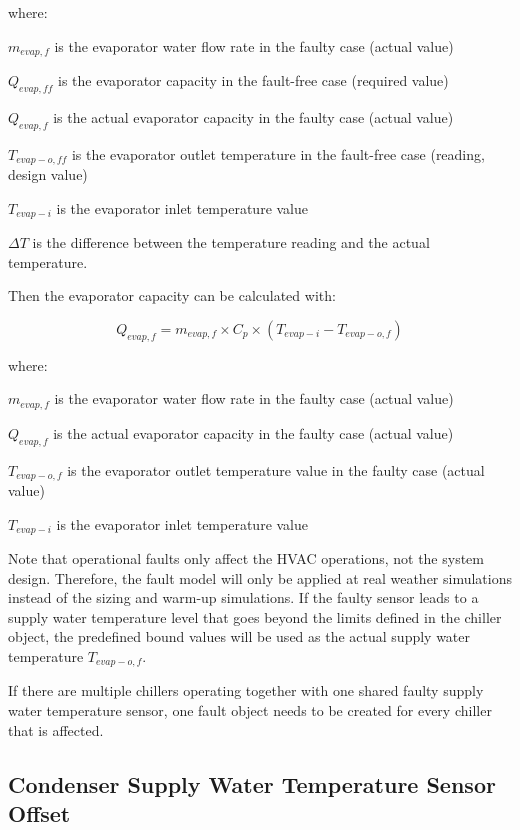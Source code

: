 where:

\(m_{evap,f}\) is the evaporator water flow rate in the faulty case (actual value)

\(Q_{evap,ff}\) is the evaporator capacity in the fault-free case (required value)

\(Q_{evap,f}\) is the actual evaporator capacity in the faulty case (actual value)

\(T_{evap-o,ff}\) is the evaporator outlet temperature in the fault-free case (reading, design value)

\(T_{evap-i}\) is the evaporator inlet temperature value 

\(\Delta T\) is the difference between the temperature reading and the actual temperature.

Then the evaporator capacity can be calculated with:

\begin{equation}
Q_{evap,f} = m_{evap,f} \times C_p \times (T_{evap-i} - T_{evap-o,f} )
\end{equation}

where:

\(m_{evap,f}\) is the evaporator water flow rate in the faulty case (actual value)

\(Q_{evap,f}\) is the actual evaporator capacity in the faulty case (actual value)

\(T_{evap-o,f}\) is the evaporator outlet temperature value in the faulty case (actual value)

\(T_{evap-i}\) is the evaporator inlet temperature value 

Note that operational faults only affect the HVAC operations, not the system design. Therefore, the fault model will only be applied at real weather simulations instead of the sizing and warm-up simulations. If the faulty sensor leads to a supply water temperature level that goes beyond the limits defined in the chiller object, the predefined bound values will be used as the actual supply water temperature \(T_{evap-o,f}\).

If there are multiple chillers operating together with one shared faulty supply water temperature sensor, one fault object needs to be created for every chiller that is affected.


\subsection{Condenser Supply Water Temperature Sensor Offset}\label{condenser-supply-water-temperature-sensor-offset}


